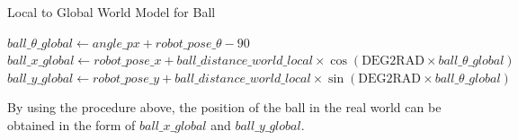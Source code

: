 \begin{algorithm}[H]
  \caption{Local to Global World Model for Ball}\label{alg:prosedur6}
  \begin{algorithmic}[1]
      \State $ball\_\theta\_global \gets angle\_px + robot\_pose\_\theta - 90$
      \State $ball\_x\_global \gets robot\_pose\_x + ball\_distance\_world\_local \times \cos(\text{DEG2RAD} \times ball\_\theta\_global)$
      \State $ball\_y\_global \gets robot\_pose\_y + ball\_distance\_world\_local \times \sin(\text{DEG2RAD} \times ball\_\theta\_global)$
  \EndProcedure
  \end{algorithmic}
\end{algorithm}

By using the procedure above, the position of the ball in the real world can be obtained in the form of $ball\_x\_global$ and $ball\_y\_global$.

